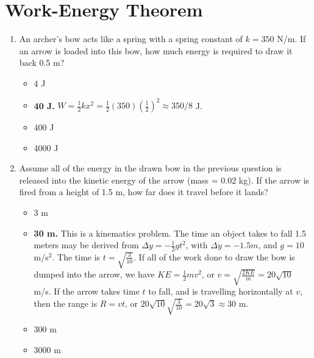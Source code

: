 \documentclass[10pt]{article}
\begin{document}
\section{Work-Energy Theorem}
\begin{enumerate}
\item An archer's bow acts like a spring with a spring constant of $k=350$ N/m.  If an arrow is loaded into this bow, how much energy is required to draw it back 0.5 m?
\begin{itemize}
\item 4 J
\item \textbf{40 J.}  $W = \frac{1}{2}kx^2 = \frac{1}{2}(350)\left(\frac{1}{2}\right)^2 \approx 350/8$ J.
\item 400 J
\item 4000 J
\end{itemize}
\item Assume all of the energy in the drawn bow in the previous question is released into the kinetic energy of the arrow (mass = 0.02 kg).  If the arrow is fired from a height of 1.5 m, how far does it travel before it lands?
\begin{itemize}
\item 3 m
\item \textbf{30 m.}  This is a kinematics problem.  The time an object takes to fall 1.5 meters may be derived from $\Delta y = -\frac{1}{2}gt^2$, with $\Delta y = -1.5 m$, and $g = 10$ m/s$^2$.  The time is $t = \sqrt{\frac{3}{10}}$.  If all of the work done to draw the bow is dumped into the arrow, we have $KE = \frac{1}{2}mv^2$, or $v = \sqrt{\frac{2KE}{m}} = 20\sqrt{10}$ m/s.  If the arrow takes time $t$ to fall, and is travelling horizontally at $v$, then the range is $R = vt$, or $20\sqrt{10}\sqrt{\frac{3}{10}} = 20\sqrt{3} \approx 30$ m.
\item 300 m
\item 3000 m
\end{itemize}
\end{enumerate}
\end{document}
